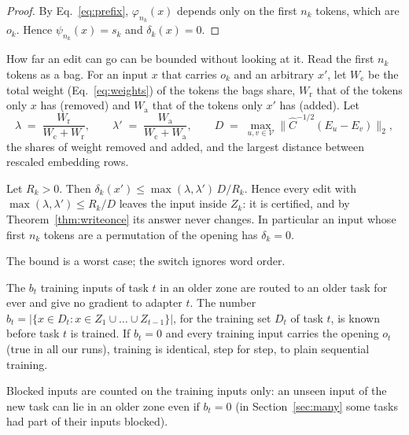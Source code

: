 \begin{proof}
By Eq.~\eqref{eq:prefix}, $\varphi_{n_k}(x)$ depends only on the first $n_k$ tokens, which are $o_k$.
Hence $\psi_{n_k}(x) = s_k$ and $\delta_k(x) = 0$.
\end{proof}

How far an edit can go can be bounded without looking at it. Read the first $n_k$ tokens as a bag. For
an input $x$ that carries $o_k$ and an arbitrary $x'$, let $W_{\mathrm{c}}$ be the total weight
(Eq.~\ref{eq:weights}) of the tokens the bags share, $W_{\mathrm{r}}$ that of the tokens only $x$ has
(removed) and $W_{\mathrm{a}}$ that of the tokens only $x'$ has (added). Let
\begin{equation}
  \lambda \;=\; \frac{W_{\mathrm{r}}}{W_{\mathrm{c}} + W_{\mathrm{r}}}, \qquad \lambda' \;=\; \frac{W_{\mathrm{a}}}{W_{\mathrm{c}} + W_{\mathrm{a}}}, \qquad
  D \;=\; \max_{u, v \in \mathcal{V}} \bigl\lVert \hat{C}^{-1/2} (E_u - E_v) \bigr\rVert_2 ,
  \label{eq:shares}
\end{equation}
the shares of weight removed and added, and the largest distance between rescaled embedding rows.

\begin{proposition}
\label{prop:edits}
Let $R_k > 0$. Then $\delta_k(x') \le \max(\lambda, \lambda')\, D / R_k$. Hence every edit with
$\max(\lambda, \lambda') \le R_k / D$ leaves the input inside $Z_k$: it is certified, and by
Theorem~\ref{thm:writeonce} its answer never changes. In particular an input whose first $n_k$ tokens
are a permutation of the opening has $\delta_k = 0$.
\end{proposition}

The bound is a worst case; the switch ignores word order.

\begin{proposition}
\label{prop:price}
The $b_t$ training inputs of task $t$ in an older zone are routed to an older task for ever and give
no gradient to adapter $t$. The number $b_t = |\{x \in D_t : x \in Z_1 \cup \dots \cup Z_{t-1}\}|$, for the training set $D_t$ of task $t$, is known before task $t$ is trained. If $b_t = 0$ and every training input carries the opening $o_t$ (true in all our runs), training is identical, step for step, to plain sequential training.
\end{proposition}

Blocked inputs are counted on the training inputs only: an unseen input of the new task can lie in an
older zone even if $b_t = 0$ (in Section~\ref{sec:many} some tasks had part of their inputs blocked).

